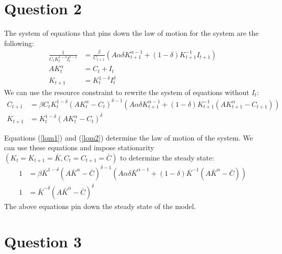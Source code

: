 \documentclass[11pt]{article} %
\begin{document}
\section{Question 2}
The system of equations that pins down the law of motion for the system are the following:
\begin{align*}
\frac{1}{C_tK_t^{1-\delta}I_t^{\delta - 1}}  &= \frac{\beta}{C_{t+1}}(A\alpha \delta K_{t+1}^{\alpha - 1} + (1-\delta)K_{t+1}^{-1}I_{t+1})\\
AK_t^{\alpha} &= C_t + I_t \\
K_{t+1} &= K_t^{1-\delta}I_t^{\delta}
\end{align*}
We can use the resource constraint to rewrite the system of equations without $I_t$:
\begin{align}
C_{t+1} &= \beta C_tK_t^{1-\delta}(AK_t^{\alpha} - C_t)^{\delta - 1}(A\alpha \delta K_{t+1}^{\alpha - 1}  + (1-\delta)K_{t+1}^{-1}(AK_{t+1}^{\alpha} - C_{t+1}) ) \label{lom1}\\
K_{t+1} &= K_t^{1-\delta}(AK_t^{\alpha} - C_t)^{\delta} \label{lom2}
\end{align}

Equations (\ref{lom1}) and (\ref{lom2}) determine the law of motion of the system. We can use these equations and impose stationarity $(K_t = K_{t+1} = \bar{K}, C_t = C_{t+1} = \bar{C})$ to determine the steady state:
\begin{align*}
1 &= \beta \bar{K}^{1-\delta}(A\bar{K}^{\alpha} - \bar{C})^{\delta - 1}(A\alpha \delta \bar{K}^{\alpha - 1} + (1 - \delta) \bar{K}^{-1}(A\bar{K}^{\alpha} - \bar{C})) \\
1 &= \bar{K}^{-\delta}(A\bar{K}^{\alpha} - \bar{C})^\delta
\end{align*}
The above equations pin down the steady state of the model.
\section{Question 3}
\end{document}
